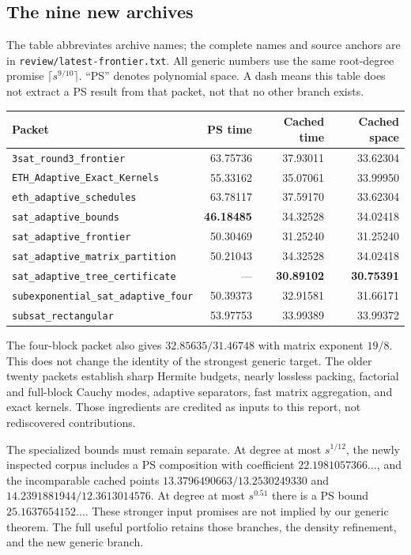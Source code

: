 \subsection{The nine new archives}
The table abbreviates archive names; the complete names and source anchors
are in \texttt{review/latest-frontier.txt}. All generic numbers use the same
root-degree promise $\lceil s^{9/10}\rceil$. ``PS'' denotes polynomial
space. A dash means this table does not extract a PS result from that packet,
not that no other branch exists.
\begin{center}\small
\begin{tabular}{p{6.1cm}rrr}
\toprule Packet & PS time & Cached time & Cached space\\\midrule
\texttt{3sat\_round3\_frontier}&63.75736&37.93011&33.62304\\
\texttt{ETH\_Adaptive\_Exact\_Kernels}&55.33162&35.07061&33.99950\\
\texttt{eth\_adaptive\_schedules}&63.78117&37.59170&33.62304\\
\texttt{sat\_adaptive\_bounds}&\textbf{46.18485}&34.32528&34.02418\\
\texttt{sat\_adaptive\_frontier}&50.30469&31.25240&31.25240\\
\texttt{sat\_adaptive\_matrix\_partition}&50.21043&34.32528&34.02418\\
\texttt{sat\_adaptive\_tree\_certificate}&---&\textbf{30.89102}&\textbf{30.75391}\\
\texttt{subexponential\_sat\_adaptive\_four}&50.39373&32.91581&31.66171\\
\texttt{subsat\_rectangular}&53.97753&33.99389&33.99372\\
\bottomrule
\end{tabular}
\end{center}
The four-block packet also gives $32.85635/31.46748$ with matrix exponent
$19/8$. This does not change the identity of the strongest generic target.
The older twenty packets establish sharp Hermite budgets, nearly lossless
packing, factorial and full-block Cauchy modes, adaptive separators, fast
matrix aggregation, and exact kernels. Those ingredients are credited as
inputs to this report, not rediscovered contributions.

The specialized bounds must remain separate. At degree at most $s^{1/12}$,
the newly inspected corpus includes a PS composition with coefficient
$22.1981057366\ldots$, and the incomparable cached points
$13.3796490663/13.2530249330$ and $14.2391881944/12.3613014576$.
At degree at most $s^{0.51}$ there is a PS bound $25.1637654152\ldots$.
These stronger input promises are not implied by our generic theorem.
The full useful portfolio retains those branches, the density refinement,
and the new generic branch.

